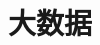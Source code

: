 \documentclass[../../interview-questions.tex]{subfiles}
\begin{document}
\section{大数据}


\end{document}
